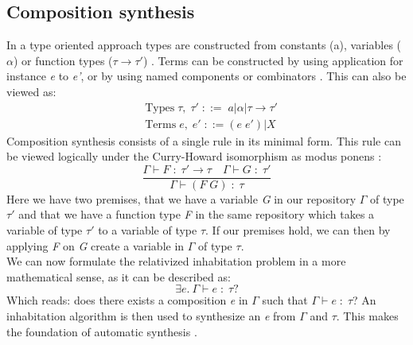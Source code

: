\subsection{Composition synthesis}
In a type oriented approach types are constructed from constants (a), variables ($\alpha$) or function types ($\tau \to \tau'$) . Terms can be constructed by using application for instance \textit{e} to \textit{e'}, or by using named components or combinators \cite{CLSPaper}. This can also be viewed as:
\begin{align*}
	&\text{Types}\; \tau,\;\tau'\; ::=\; a | \alpha | \tau \to \tau'\\
	&\text{Terms}\; e,\; e'\; ::= (e\; e') | X
\end{align*}
Composition synthesis consists of a single rule in its minimal form. This rule can be viewed logically under the Curry-Howard isomorphism as modus ponens \cite{CLSPaper}:
\begin{equation*}
	\frac{\Gamma \vdash F\; : \; \tau' \to \tau \quad \Gamma \vdash G\; : \; \tau'}{\Gamma \vdash (F\; G)\; : \; \tau}
\end{equation*}
Here we have two premises, that we have a variable \textit{G} in our repository $\Gamma$ of type $\tau'$ and that we have a function type \textit{F} in the same repository which takes a variable of type $\tau'$ to a variable of type $\tau$. If our premises hold, we can then by applying \textit{F} on \textit{G} create a variable in $\Gamma$ of type $\tau$.\\
We can now formulate the relativized inhabitation problem in a more mathematical sense, as it can be described as:
\begin{equation*}
	\exists e.\ \Gamma \vdash e\; : \; \tau?
\end{equation*}
Which reads: does there exists a composition \textit{e} in $\Gamma$ such that $\Gamma \vdash e\; : \; \tau$? An inhabitation algorithm is then used to synthesize an \textit{e} from $\Gamma$ and $\tau$. This makes the foundation of automatic synthesis \cite{CLSPaper}.

